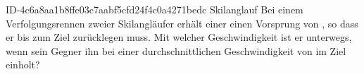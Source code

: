 \begin{exercise}
      {ID-4c6a8aa1b8ffe03c7aabf5cfd24f4c0a4271bedc}
      {Skilanglauf}
  \ifproblem\problem
    Bei einem Verfolgungsrennen zweier Skilangläufer erhält einer einen Vorsprung
    von , so dass er bis zum Ziel  zurücklegen muss. Mit
    welcher Geschwindigkeit ist er unterwegs, wenn sein Gegner ihn bei einer
    durchschnittlichen Geschwindigkeit von  im Ziel einholt?
  \fi
\end{exercise}
